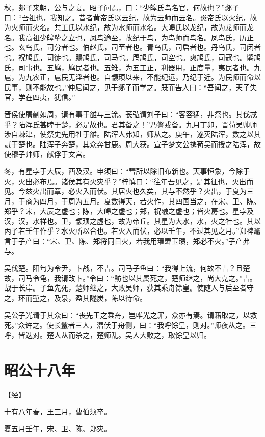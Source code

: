 \documentclass[a4paper,12pt,UTF8,twoside]{ctexbook}
\begin{document}
秋，郯子来朝，公与之宴。昭子问焉，曰：“少皞氏鸟名官，何故也？”郯子曰：“吾祖也，我知之。昔者黄帝氏以云纪，故为云师而云名。炎帝氏以火纪，故为火师而火名。共工氏以水纪，故为水师而水名。大皞氏以龙纪，故为龙师而龙名。我高祖少皞挚之立也，凤鸟適至，故纪于鸟，为鸟师而鸟名。凤鸟氏，历正也。玄鸟氏，司分者也。伯赵氏，司至者也。青鸟氏，司启者也。丹鸟氏，司闭者也。祝鸠氏，司徒也。鴡鸠氏，司马也。鸤鸠氏，司空也。爽鸠氏，司寇也。鹘鸠氏，司事也。五鸠，鸠民者也。五雉，为五工正，利器用，正度量，夷民者也。九扈，为九农正，扈民无淫者也。自颛顼以来，不能纪远，乃纪于近。为民师而命以民事，则不能故也。”仲尼闻之，见于郯子而学之。既而告人曰：“吾闻之，天子失官，学在四夷，犹信。”

晋侯使屠蒯如周，请有事于雒与三涂。苌弘谓刘子曰：“客容猛，非祭也。其伐戎乎？陆浑氏甚睦于楚，必是故也。君其备之！”乃警戎备。九月丁卯，晋荀吴帅师涉自棘津，使祭史先用牲于雒。陆浑人弗知，师从之。庚午，遂灭陆浑，数之以其贰于楚也。陆浑子奔楚，其众奔甘鹿。周大获。宣子梦文公携荀吴而授之陆浑，故使穆子帅师，献俘于文宫。

冬，有星孛于大辰，西及汉。申须曰：“彗所以除旧布新也。天事恒象，今除于火，火出必布焉。诸侯其有火灾乎？”梓慎曰：“往年吾见之，是其征也，火出而见。今兹火出而章，必火入而伏。其居火也久矣，其与不然乎？火出，于夏为三月，于商为四月，于周为五月。夏数得天，若火作，其四国当之，在宋、卫、陈、郑乎？宋，大辰之虚也；陈，大皞之虚也；郑，祝融之虚也；皆火房也。星孛及汉，汉，水祥也。卫，颛顼之虚也，故为帝丘。其星为大水，水，火之牡也。其以丙子若壬午作乎？水火所以合也。若火入而伏，必以壬午，不过其见之月。”郑裨竈言于子产曰：“宋、卫、陈、郑将同日火，若我用瓘斝玉瓒，郑必不火。”子产弗与。

吴伐楚。阳匄为令尹，卜战，不吉。司马子鱼曰：“我得上流，何故不吉？且楚故，司马令龟，我请改卜。”令曰：“鲂也以其属死之，楚师继之，尚大克之。”吉。战于长岸。子鱼先死，楚师继之，大败吴师，获其乘舟馀皇。使随人与后至者守之，环而堑之，及泉，盈其隧炭，陈以待命。

吴公子光请于其众曰：“丧先王之乘舟，岂唯光之罪，众亦有焉。请藉取之，以救死。”众许之。使长鬣者三人，潜伏于舟侧，曰：“我呼馀皇，则对。”师夜从之。三呼，皆迭对。楚人从而杀之，楚师乱。吴人大败之，取馀皇以归。


\section{昭公十八年}



【经】

十有八年春，王三月，曹伯须卒。

夏五月壬午，宋、卫、陈、郑灾。
\end{document}
